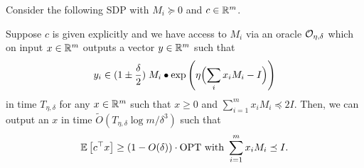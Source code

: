 \begin{lemma}
\label{lem:alo16}
Consider the following SDP with $M_i \succeq 0$ and $c \in \mathbb{R}^m$.
\begin{lp*}
\st {}
\end{lp*}
Suppose $c$ is given explicitly and we have access to $M_i$ via an oracle $\mathcal{O}_{\eta, \delta}$ which on input $x \in \mathbb{R}^m$ outputs a vector $y \in \mathbb{R}^m$ such that
\[
y_i \in (1 \pm \frac{\delta}{2}) \; M_i \bullet \exp \left(\eta \Bigl(\sum_{i} x_i M_i - I \Bigr) \right)
\]
in time $T_{\eta, \delta}$ for any $x \in \mathbb{R}^m$ such that $x \ge 0$ and $\sum_{i=1}^m x_i M_i \preceq 2I$.
Then, we can output an $x$ in time $\tilde O(T_{\eta, \delta} \log m / \delta^3)$ such that
\[
\expect{}{c^\top x} \ge (1-O(\delta)) \cdot \mathrm{OPT} \text{ with } \sum_{i=1}^m x_i M_i \preceq I.
\]
\end{lemma}




